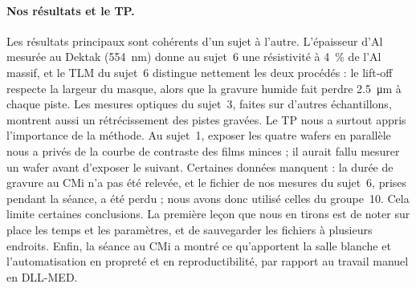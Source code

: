 \paragraph{Nos résultats et le TP.}
Les résultats principaux sont cohérents d'un sujet à l'autre. L'épaisseur d'Al mesurée au Dektak (\qty{554}{\nano\metre}) donne au sujet~6 une résistivité à \qty{4}{\percent} de l'Al massif, et le TLM du sujet~6 distingue nettement les deux procédés : le lift-off respecte la largeur du masque, alors que la gravure humide fait perdre \qty{2,5}{\micro\metre} à chaque piste. Les mesures optiques du sujet~3, faites sur d'autres échantillons, montrent aussi un rétrécissement des pistes gravées. Le TP nous a surtout appris l'importance de la méthode. Au sujet~1, exposer les quatre wafers en parallèle nous a privés de la courbe de contraste des films minces ; il aurait fallu mesurer un wafer avant d'exposer le suivant. Certaines données manquent : la durée de gravure au CMi n'a pas été relevée, et le fichier de nos mesures du sujet~6, prises pendant la séance, a été perdu ; nous avons donc utilisé celles du groupe~10. Cela limite certaines conclusions. La première leçon que nous en tirons est de noter sur place les temps et les paramètres, et de sauvegarder les fichiers à plusieurs endroits. Enfin, la séance au CMi a montré ce qu'apportent la salle blanche et l'automatisation en propreté et en reproductibilité, par rapport au travail manuel en DLL-MED.
